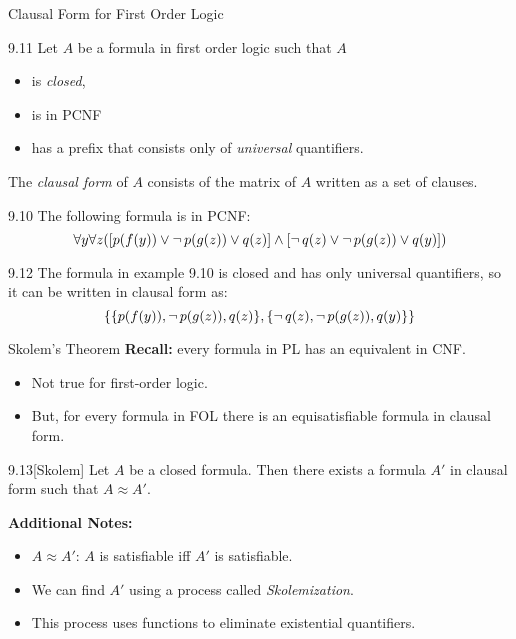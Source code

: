 \documentclass[style=sailor,size=12pt]{powerdot}
\begin{document}
\begin{wideslide}[bm=,toc=]{Clausal Form for First Order Logic}
\begin{defn}{9.11}
Let $A$ be a formula in first order logic such that $A$
\begin{itemize}
\item<2-> is \emph{closed},
\item<3-> is in PCNF 
\item<4-> has a prefix that consists only of \emph{universal} quantifiers. 
\end{itemize}
\pause[4]
The \emph{clausal form} of $A$ consists of the matrix of $A$ written as a set of clauses.
\end{defn}
\pause
\begin{ex}{9.10}
The following formula is in PCNF:
\[
  \forall y \forall z([p(f(y)) \lor \mathop{\neg} p (g(z)) \lor q(z)] \land [ \mathop{\neg} q(z)
      \lor \mathop{\neg} p (g(z)) \lor q(y)])
  \]
\end{ex}
\pause
\begin{ex}{9.12}
The formula in example 9.10 is closed and has only universal quantifiers, so it
can be written in clausal form as:
\[
   \{\{p(f(y)), \mathop{\neg} p(g(z)), q(z)\}, \{ \mathop{\neg} q(z), \mathop{\neg} p (g(z)), q(y)\}\}
  \]
\end{ex}
\end{wideslide}
\begin{wideslide}[bm=,toc=]{Skolem's Theorem}
{\bf Recall:} every formula in PL has an equivalent in CNF.
\begin{itemize}
\item<2-> Not true for first-order logic.
\item<3-> But, for every formula in FOL there is an equisatisfiable formula
in clausal form.
\end{itemize}
\pause[3]
\begin{thm}{9.13}[Skolem]
Let $A$ be a closed formula. Then there exists a formula $A'$ in clausal form
such that $A \approx A'$.
\end{thm}
\pause
\textbf{Additional Notes:}
\begin{itemize}
\item<6-> $A \approx A'$: $A$ is satisfiable iff $A'$ is satisfiable. 
\item<7-> We can find $A'$ using a process called \emph{Skolemization}. 
\item<8-> This process uses functions to eliminate existential quantifiers.
\end{itemize}
\end{wideslide}
\end{document}
